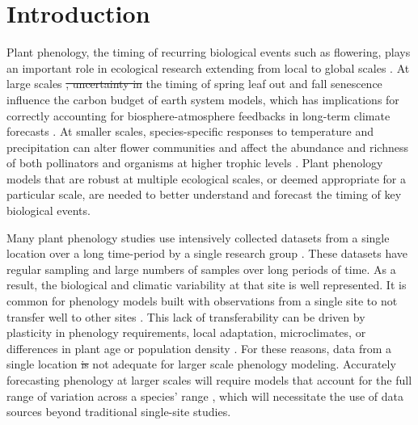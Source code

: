 \documentclass[fleqn,12pt,lineno]{article}
\providecommand{\DIFadd}[1]{{\protect\color{blue}\uwave{#1}}} %
\providecommand{\DIFdel}[1]{{\protect\color{red}\sout{#1}}}                      %
\providecommand{\DIFaddbegin}{} %
\providecommand{\DIFaddend}{} %
\providecommand{\DIFdelbegin}{} %
\providecommand{\DIFdelend}{} %
\begin{document}
\begin{abstract}
\end{abstract}

\DIFdelbegin %
\DIFdelend \DIFaddbegin {}
\DIFaddend 


\newpage
\section*{Introduction}

Plant phenology, the timing of recurring biological events such as flowering, plays an important role in ecological research extending from local to global scales \citep{cleland2007, richardson2013, tang2016}. At large scales \DIFdelbegin \DIFdel{, uncertainty in }\DIFdelend the timing of spring leaf out and fall senescence influence the carbon budget of earth system models, which has implications for correctly accounting for biosphere-atmosphere feedbacks in long-term climate forecasts \citep{richardson2012}. At smaller scales, species-specific responses to temperature and precipitation can alter flower communities \citep{diez2012, caradonna2014, theobald2017} and affect the abundance and richness of both pollinators \citep{ogilvie2017a, ogilvie2017b} and organisms at higher trophic levels \citep{tylianakis2008}. Plant phenology models that are robust at multiple ecological scales, or deemed appropriate for a particular scale, are needed to better understand and forecast the timing of key biological events.

Many plant phenology studies use intensively collected datasets from a single location over a long time-period by a single research group \citep{cook2012, wolkovich2012, iler2013, roberts2015}. These datasets have regular sampling and large numbers of samples over long periods of time. As a result, the biological and climatic variability at that site is well represented. It is common for phenology models built with observations from a single site to not transfer well to other sites \citep{garcia-mozo2008, xu2013, olsson2014, basler2016}. This lack of transferability can be driven by plasticity in phenology requirements, local adaptation, microclimates, or differences in plant age or population density \citep{kramer1995, diez2012}. For these reasons, data from a single location \DIFdelbegin \DIFdel{is }\DIFdelend \DIFaddbegin \DIFadd{are }\DIFaddend not adequate for larger scale phenology modeling. Accurately forecasting phenology at larger scales will require models that account for the full range of variation across a species' range \citep{richardson2013, tang2016, chuine2017}, which will necessitate the use of data sources beyond traditional single-site studies.
\end{document}
